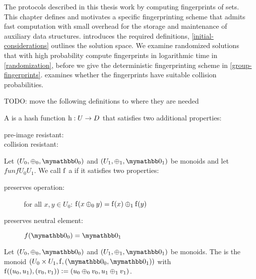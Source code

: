 
The protocols described in this thesis work by computing fingerprints of sets.
This chapter defines and motivates a specific fingerprinting scheme that admits fast computation with small overhead for the storage and maintenance of auxiliary data structures.  introduces the required definitions, \cref{initial-considerations} outlines the solution space. We examine randomized solutions that with high probability compute fingerprints in logarithmic time in \cref{randomization}, before we give the deterministic fingerprinting scheme in \cref{group-fingerprints}.  examines whether the fingerprints have suitable collision probabilities.



TODO: move the following definitions to where they are needed

\begin{definition}
A  is a hash function ${\operatorname{h}}: {U} \rightarrow {D}$ that satisfies two additional properties:

\begin{description}
  \item[pre-image resistant:] 
  \item[collision resistant:] 
\end{description}
\end{definition}

\begin{definition}
Let $(U_0, \groupaddsym_0, \neutraladd_0)$ and $(U_1, \groupaddsym_1, \neutraladd_1)$ be monoids and let $fun{f}{U_0}{U_1}$. We call $\operatorname{f}$ a  if it satisfies two properties:

\begin{description}
  \item[preserves operation:] for all $x, y \in U_0$: $\operatorname{f}(x \oplus_0 y) = \operatorname{f}(x) \oplus_1 \operatorname{f}(y)$
  \item[preserves neutral element:] $f(\neutraladd_0) = \neutraladd_1$
\end{description}
\end{definition}

\begin{definition}
Let $(U_0, \groupaddsym_0, \neutraladd_0)$ and $(U_1, \groupaddsym_1, \neutraladd_1)$ be monoids. The  is the monoid $(U_0 \times U_1, \f, (\neutraladd_0, \neutraladd_1))$ with $\operatorname{f}((u_0, u_1), (v_0, v_1)) \vcentcolon= (u_0 \oplus_0 v_0, u_1 \oplus_1 v_1)$.
\end{definition}

